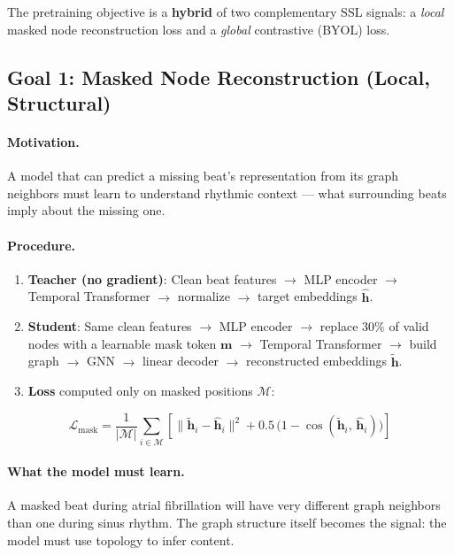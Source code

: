 \documentclass[11pt,a4paper]{article}
\begin{document}
The pretraining objective is a \textbf{hybrid} of two complementary SSL signals:
a \emph{local} masked node reconstruction loss and a \emph{global} contrastive (BYOL) loss.

\subsection{Goal 1: Masked Node Reconstruction (Local, Structural)}

\paragraph{Motivation.}
A model that can predict a missing beat's representation from its graph neighbors must learn to understand
rhythmic context --- what surrounding beats imply about the missing one.

\paragraph{Procedure.}
\begin{enumerate}[leftmargin=*]
    \item \textbf{Teacher (no gradient)}: Clean beat features $\rightarrow$ MLP encoder $\rightarrow$ Temporal Transformer $\rightarrow$ normalize $\rightarrow$ target embeddings $\hat{\mathbf{h}}$.
    \item \textbf{Student}: Same clean features $\rightarrow$ MLP encoder $\rightarrow$ replace 30\% of valid nodes with a learnable mask token $\mathbf{m}$ $\rightarrow$ Temporal Transformer $\rightarrow$ build graph $\rightarrow$ GNN $\rightarrow$ linear decoder $\rightarrow$ reconstructed embeddings $\tilde{\mathbf{h}}$.
    \item \textbf{Loss} computed only on masked positions $\mathcal{M}$:
\end{enumerate}
\[
    \mathcal{L}_{\text{mask}} = \frac{1}{|\mathcal{M}|}\sum_{i \in \mathcal{M}}
    \left[
        \|\tilde{\mathbf{h}}_i - \hat{\mathbf{h}}_i\|^2
        + 0.5\,\bigl(1 - \cos(\tilde{\mathbf{h}}_i,\, \hat{\mathbf{h}}_i)\bigr)
    \right]
\]

\paragraph{What the model must learn.}
A masked beat during atrial fibrillation will have very different graph neighbors than one during sinus rhythm.
The graph structure itself becomes the signal: the model must use topology to infer content.
\end{document}
